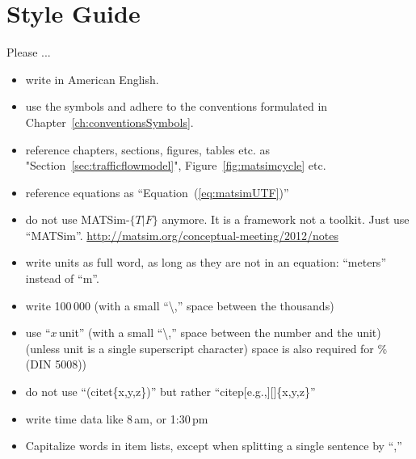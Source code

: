 


\section*{Style Guide}
\label{sec:styleguide}

Please ...

\begin{itemize}\styleItemize

\item write in American English.

\item use the symbols and adhere to the conventions formulated in Chapter~\ref{ch:conventionsSymbols}.

\item reference chapters, sections, figures, tables etc. as "Section~\ref{sec:trafficflowmodel}", Figure~\ref{fig:matsimcycle} etc.

\item reference equations as ``Equation~(\ref{eq:matsimUTF})''

\item do not use MATSim-$\{T\lvert F\}$ anymore. It is a framework not a toolkit. Just use ``MATSim''. \url{http://matsim.org/conceptual-meeting/2012/notes}

\item write units as full word, as long as they are not in an equation: ``meters'' instead of ``m''. 

\item write 100\,000 (with a small ``\textbackslash,'' space between the thousands)

\item use ``$x$\,unit'' (with a small ``\textbackslash,'' space between the number and the unit) (unless unit is a single superscript character) space is also required for \% (DIN 5008))

\item do not use ``(\eg citet\{x,y,z\})'' but rather ``citep[e.g.,][]\{x,y,z\}''

\item write time data like 8\,am, or 1:30\,pm

\item Capitalize words in item lists, except when splitting a single sentence by ``,''


\end{itemize}
